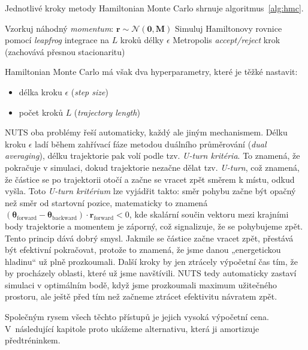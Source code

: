 Jednotlivé kroky metody Hamiltonian Monte Carlo shrnuje algoritmus~\ref{alg:hmc}.

\begin{algorithm}
\caption{Hamiltonian Monte Carlo}
\label{alg:hmc}
\begin{algorithmic}[1]
\State Vzorkuj náhodný \emph{momentum}: $\mathbf{r} \sim \mathcal{N}(\mathbf{0}, \mathbf{M})$
\State Simuluj Hamiltonovy rovnice pomocí \emph{leapfrog} integrace na $L$ kroků délky $\epsilon$
\State Metropolis \emph{accept/reject} krok (zachovává přesnou stacionaritu)
\end{algorithmic}
\end{algorithm}

Hamiltonian Monte Carlo má však dva hyperparametry, které je těžké nastavit:
\begin{itemize}
    \item délka kroku $\epsilon$ (\emph{step size})
    \item počet kroků $L$ (\emph{trajectory length})
\end{itemize}

NUTS oba problémy řeší automaticky, každý ale jiným mechanismem.
Délku kroku $\epsilon$ ladí během zahřívací fáze metodou duálního průměrování (\emph{dual averaging}), délku trajektorie pak volí podle tzv. \emph{U-turn kritéria}.
To znamená, že pokračuje v simulaci, dokud trajektorie nezačne dělat tzv. \emph{U-turn}, což znamená, že částice se po trajektorii otočí a začne se vracet zpět směrem k místu, odkud vyšla.
Toto \emph{U-turn kritérium} lze vyjádřit takto: směr pohybu začne být opačný než směr od startovní pozice, matematicky to znamená $(\boldsymbol{\theta}_{\text{forward}} - \boldsymbol{\theta}_{\text{backward}}) \cdot \mathbf{r}_{\text{forward}} < 0$, kde skalární součin vektoru mezi krajními body trajektorie a momentem je záporný, což signalizuje, že se pohybujeme zpět.
Tento princip dává dobrý smysl.
Jakmile se částice začne vracet zpět, přestává být efektivní pokračovat, protože to znamená, že jsme danou „energetickou hladinu“ už plně prozkoumali.
Další kroky by jen ztrácely výpočetní čas tím, že by procházely oblasti, které už jsme navštívili. 
NUTS tedy automaticky zastaví simulaci v optimálním bodě, když jsme prozkoumali maximum užitečného prostoru, ale ještě před tím než začneme ztrácet efektivitu návratem zpět.
\par

Společným rysem všech těchto přístupů je jejich vysoká výpočetní cena.
V~následující kapitole proto ukážeme alternativu, která ji amortizuje předtréninkem.


